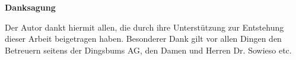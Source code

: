 
\begin{LARGE}
    \textbf{Danksagung}
\end{LARGE}

\vspace{1cm}

Der Autor dankt hiermit allen, die durch ihre Unterstützung zur
Entstehung dieser Arbeit beigetragen haben. Besonderer Dank gilt
vor allen Dingen den Betreuern seitens der Dingsbums AG, den
Damen und Herren Dr. Sowieso etc.

\newpage
